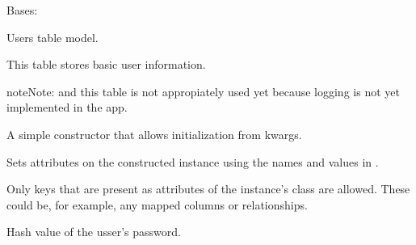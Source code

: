 \documentclass[a4paper,landscape,10pt,english]{sphinxmanual}
\begin{document}
\begin{fulllineitems}
\label{\detokenize{code_docs/simulation_api.model:simulation_api.model.models.UserDB}}
Bases: 

Users table model.

This table stores basic user information.

\begin{sphinxadmonition}{note}{Note:}
{\hyperref[\detokenize{code_docs/simulation_api.model:simulation_api.model.models.UserDB.hash_value}]{}} and this  table is not
appropiately used yet because logging is not yet implemented in the app.
\end{sphinxadmonition}

\begin{fulllineitems}
\label{\detokenize{code_docs/simulation_api.model:simulation_api.model.models.UserDB.__init__}}
A simple constructor that allows initialization from kwargs.

Sets attributes on the constructed instance using the names and
values in .

Only keys that are present as
attributes of the instance’s class are allowed. These could be,
for example, any mapped columns or relationships.

\end{fulllineitems}


\begin{fulllineitems}
\label{\detokenize{code_docs/simulation_api.model:simulation_api.model.models.UserDB.hash_value}}
Hash value of the usser’s password.

\end{fulllineitems}


\end{fulllineitems}
\end{document}
